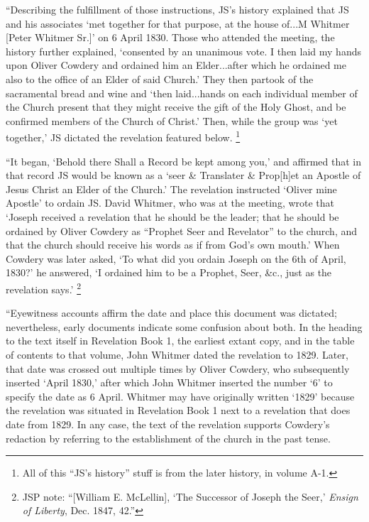 			``Describing the fulfillment of those instructions, JS's history explained that JS and his associates `met together for that purpose, at the house of...M Whitmer [Peter Whitmer Sr.]' on 6 April 1830. Those who attended the meeting, the history further explained, `consented by an unanimous vote. I then laid my hands upon Oliver Cowdery and ordained him an Elder...after which he ordained me also to the office of an Elder of said Church.' They then partook of the sacramental bread and wine and `then laid...hands on each individual member of the Church present that they might receive the gift of the Holy Ghost, and be confirmed members of the Church of Christ.' Then, while the group was `yet together,' JS dictated the revelation featured below.%
				\footnote{%
					All of this ``JS's history'' stuff is from the later history, in volume A-1.
					}

			``It began, `Behold there Shall a Record be kept among you,' and affirmed that in that record JS would be known as a `seer \& Translater \& Prop[h]et an Apostle of Jesus Christ an Elder of the Church.' The revelation instructed `Oliver mine Apostle' to ordain JS. David Whitmer, who was at the meeting, wrote that `Joseph received a revelation that he should be the leader; that he should be ordained by Oliver Cowdery as ``Prophet Seer and Revelator'' to the church, and that the church should receive his words as if from God's own mouth.' When Cowdery was later asked, `To what did you ordain Joseph on the 6th of April, 1830?' he answered, `I ordained him to be a Prophet, Seer, \&c., just as the revelation says.'%
				\footnote{%
					JSP note: ``[William E. McLellin], `The Successor of Joseph the Seer,' \textit{Ensign of Liberty}, Dec. 1847, 42.''
					}

			``Eyewitness accounts affirm the date and place this document was dictated; nevertheless, early documents indicate some confusion about both. In the heading to the text itself in Revelation Book 1, the earliest extant copy, and in the table of contents to that volume, John Whitmer dated the revelation to 1829. Later, that date was crossed out multiple times by Oliver Cowdery, who subsequently inserted `April 1830,' after which John Whitmer inserted the number `6' to specify the date as 6 April. Whitmer may have originally written `1829' because the revelation was situated in Revelation Book 1 next to a revelation that does date from 1829. In any case, the text of the revelation supports Cowdery's redaction by referring to the establishment of the church in the past tense.

